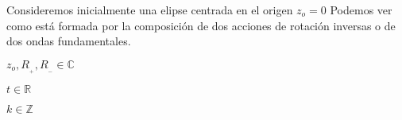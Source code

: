 \documentclass[preview]{standalone}
\begin{document}
\begin{center}
Consideremos inicialmente una elipse centrada en el origen $z_o=0$ 
Podemos ver como  está formada por la composición  de dos acciones 
de rotación inversas o de dos ondas fundamentales.

$z_o , R_{_+} , R_{_-} \in \mathbb{C}$  

$t \in \mathbb{R}$    

$k \in \mathbb{Z}$
\end{center}
\end{document}
